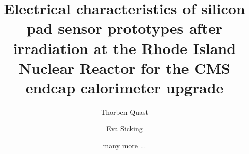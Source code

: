 \documentclass[a4paper,11pt]{article}
\title{\boldmath Electrical characteristics of silicon pad sensor prototypes after irradiation at the Rhode Island Nuclear Reactor for the CMS endcap calorimeter upgrade}
\author[a]{Thorben Quast}
\author[a]{Eva Sicking}
\author[a]{many more ...}
\affiliation[a]{CERN Experimental Physics Department}
\begin{document}
\maketitle
\flushbottom

\linenumbers










\appendix




\end{document}
